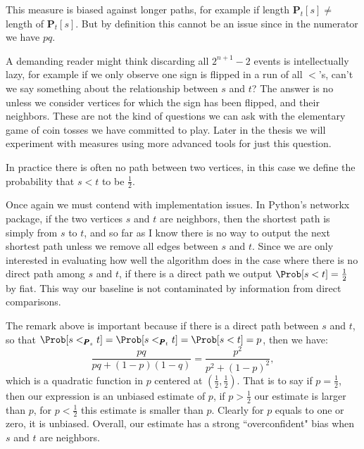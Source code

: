 \begin{remark}
	This measure is biased against longer paths, for example if length $\pmb{P}_t[s] \neq $ length of $\pmb{P}_t[s]$. But by definition this cannot be an issue since in the numerator we have $pq$.
\end{remark}

\begin{remark}
	A demanding reader might think discarding all $2^{n+1} - 2$ events is intellectually lazy, for example if we only observe one sign is flipped in a run of all $<$'s, can't we say something about the relationship between $s$ and $t$? The answer is no unless we consider vertices for which the sign has been flipped, and their neighbors. These are not the kind of questions we can ask with the elementary game of coin tosses we have committed to play. Later in the thesis we will experiment with measures using more advanced tools for just this question.
\end{remark}

\begin{remark}
	In practice there is often no path between two vertices, in this case we define the probability that $s < t$ to be $\frac{1}{2}$.
\end{remark}

\begin{remark}
 	Once again we must contend with implementation issues. In Python's networkx package, if the two vertices $s$ and $t$ are neighbors, then the shortest path is simply from $s$ to $t$, and so far as I know there is no way to output the next shortest path unless we remove all edges between $s$ and $t$. Since we are only interested in evaluating how well the algorithm does in the case where there is no direct path among $s$ and $t$, if there is a direct path we output $\Prob[ s < t ] = \frac{1}{2}$ by fiat. This way our baseline is not contaminated by information from direct comparisons.
\end{remark}

\begin{remark}
	The remark above is important because if there is a direct path between $s$ and $t$, so that $\Prob[s <_{\pmb{P}_s} t] = \Prob[s <_{\pmb{P}_t} t] = \Prob[s < t] = p$, then we have:
		\[
			\frac{pq}{pq + (1-p)(1-q)} = \frac{p^2}{p^2 + (1-p)^2},
		\]
	which is a quadratic function in $p$ centered at $(\frac{1}{2}, \frac{1}{2})$. That is to say if $p = \frac{1}{2}$, then our expression is an unbiased estimate of $p$, if $p > \frac{1}{2}$ our estimate is larger than $p$, for $p < \frac{1}{2}$ this estimate is smaller than $p$. Clearly for $p$ equals to one or zero, it is unbiased. Overall, our estimate has a strong ``overconfident" bias when $s$ and $t$ are neighbors.
\end{remark}

